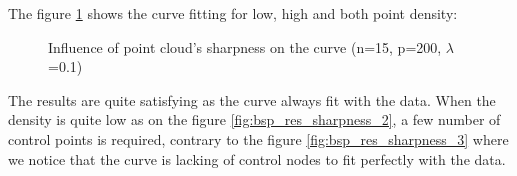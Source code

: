 \documentclass{article}
\begin{document}
The figure \ref{fig:bsp_res_sharpness} shows the curve fitting for low, high and both point density:

\begin{figure}[H]
    \centering
    \caption[Influence of point cloud's sharpness on the curve]{Influence of point cloud's sharpness on the curve (n=15, p=200, $\lambda$=0.1)}
    \label{fig:bsp_res_sharpness}
\end{figure}

The results are quite satisfying as the curve always fit with the data. When the density is quite low as on the figure \ref{fig:bsp_res_sharpness_2}, a few number of control points is required, contrary to the figure \ref{fig:bsp_res_sharpness_3} where we notice that the curve is lacking of control nodes to fit perfectly with the data.
\end{document}
